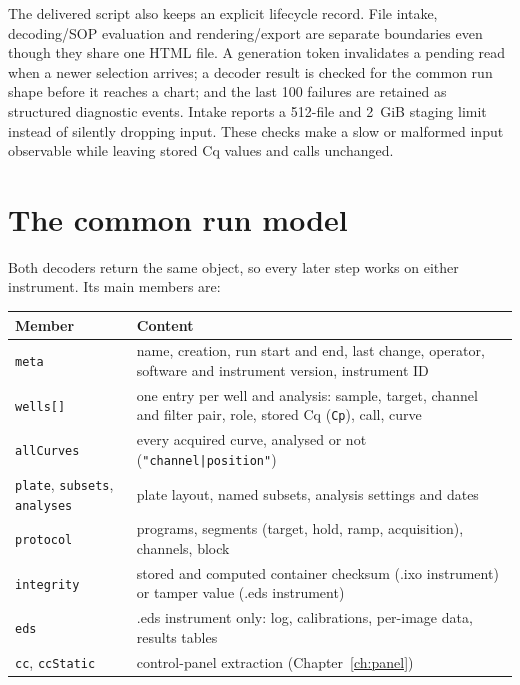 The delivered script also keeps an explicit lifecycle record. File intake, decoding/SOP evaluation and rendering/export are
separate boundaries even though they share one HTML file. A generation token invalidates a pending read when a newer selection
arrives; a decoder result is checked for the common run shape before it reaches a chart; and the last 100 failures are retained
as structured diagnostic events. Intake reports a 512-file and 2~GiB staging limit instead of silently dropping input. These
checks make a slow or malformed input observable while leaving stored Cq values and calls unchanged.






\section{The common run model}
Both decoders return the same object, so every later step works on either instrument. Its main members are:
\begin{center}\small
\begin{tabular}{@{}lp{11.5cm}@{}}\toprule
Member & Content\\\midrule
\texttt{meta} & name, creation, run start and end, last change, operator, software and instrument version, instrument ID\\
\texttt{wells[]} & one entry per well and analysis: sample, target, channel and filter pair, role, stored Cq (\texttt{Cp}), call, curve\\
\texttt{allCurves} & every acquired curve, analysed or not (\texttt{"channel|position"})\\
\texttt{plate}, \texttt{subsets}, \texttt{analyses} & plate layout, named subsets, analysis settings and dates\\
\texttt{protocol} & programs, segments (target, hold, ramp, acquisition), channels, block\\
\texttt{integrity} & stored and computed container checksum (.ixo instrument) or tamper value (.eds instrument)\\
\texttt{eds} & .eds instrument only: log, calibrations, per-image data, results tables\\
\texttt{cc}, \texttt{ccStatic} & control-panel extraction (Chapter~\ref{ch:panel})\\\bottomrule
\end{tabular}
\end{center}



